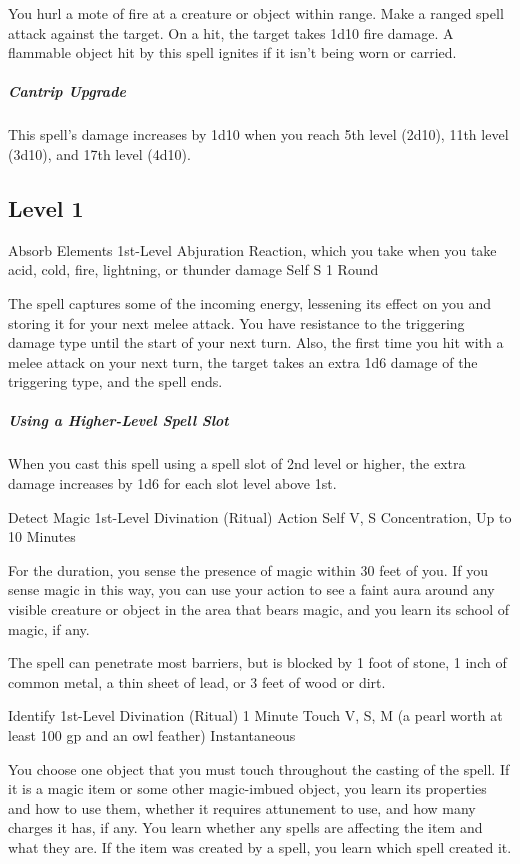 \documentclass[letterpaper,openany,oneside,twocolumn]{book}
\begin{document}
You hurl a mote of fire at a creature or object within range. Make a ranged spell attack against the target. On a hit, the target takes 1d10 fire damage. A flammable object hit by this spell ignites if it isn't being worn or carried.

\subparagraph*{Cantrip Upgrade} This spell's damage increases by 1d10 when you reach 5th level (2d10), 11th level (3d10), and 17th level (4d10).

\subsection*{Level 1}

\DndSpellHeader
  {Absorb Elements}
  {1st-Level Abjuration}
  {Reaction, which you take when you take acid, cold, fire, lightning, or thunder damage}
  {Self}
  {S}
  {1 Round}

The spell captures some of the incoming energy, lessening its effect on you and storing it for your next melee attack. You have resistance to the triggering damage type until the start of your next turn. Also, the first time you hit with a melee attack on your next turn, the target takes an extra 1d6 damage of the triggering type, and the spell ends.

\subparagraph*{Using a Higher-Level Spell Slot} When you cast this spell using a spell slot of 2nd level or higher, the extra damage increases by 1d6 for each slot level above 1st.

\DndSpellHeader
  {Detect Magic}
  {1st-Level Divination (Ritual)}
  {Action}
  {Self}
  {V, S}
  {Concentration, Up to 10 Minutes}

For the duration, you sense the presence of magic within 30 feet of you. If you sense magic in this way, you can use your action to see a faint aura around any visible creature or object in the area that bears magic, and you learn its school of magic, if any.

The spell can penetrate most barriers, but is blocked by 1 foot of stone, 1 inch of common metal, a thin sheet of lead, or 3 feet of wood or dirt.

\DndSpellHeader
  {Identify}
  {1st-Level Divination (Ritual)}
  {1 Minute}
  {Touch}
  {V, S, M (a pearl worth at least 100 gp and an owl feather)}
  {Instantaneous}

You choose one object that you must touch throughout the casting of the spell. If it is a magic item or some other magic-imbued object, you learn its properties and how to use them, whether it requires attunement to use, and how many charges it has, if any. You learn whether any spells are affecting the item and what they are. If the item was created by a spell, you learn which spell created it.
\end{document}

